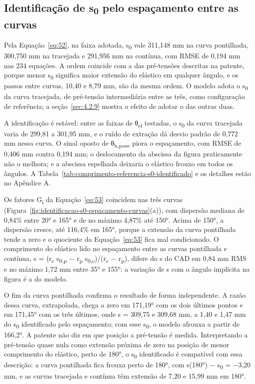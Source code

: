 \subsection{\texorpdfstring{Identificação de s\textsubscript{0} pelo espaçamento entre as curvas}{Identificação de s0 pelo espaçamento entre as curvas}}\label{sec:4.2.4}

Pela Equação~\eqref{eq:52}, na faixa adotada, s\textsubscript{0} vale 311,148 mm na curva pontilhada, 300,750 mm na tracejada e 291,956 mm na contínua, com RMSE de 0,194 mm nas 234 equações. A ordem coincide com a das pré-tensões descritas na patente, porque menor s\textsubscript{0} significa maior extensão do elástico em qualquer ângulo, e os passos entre curvas, 10,40 e 8,79 mm, são da mesma ordem. O modelo adota o s\textsubscript{0} da curva tracejada, de pré-tensão intermediária entre as três, como configuração de referência; a seção~\ref{sec:4.2.9} mostra o efeito de adotar o das outras duas.

A identificação é estável: entre as faixas de θ\textsubscript{el} testadas, o s\textsubscript{0} da curva tracejada varia de 299,81 a 301,95 mm, e o ruído de extração dá desvio padrão de 0,772 mm nessa curva. O sinal oposto de θ\textsubscript{b,pose} piora o espaçamento, com RMSE de 0,406 mm contra 0,194 mm; o deslocamento da abscissa da figura praticamente não o melhora; e a abscissa espelhada deixaria o elástico frouxo em todos os ângulos. A Tabela~\ref{tab:comprimento-referencia-s0-identificado} e os detalhes estão no Apêndice A.

Os fatores G\textsubscript{i} da Equação~\eqref{eq:53} coincidem nas três curvas (Figura~\ref{fig:identificacao-s0-espacamento-curvas}(a)), com dispersão mediana de 0,84\% entre 20° e 165° e de no máximo 4,87\% até 150°. Acima de 150°, a dispersão cresce, até 116,4\% em 165°, porque a extensão da curva pontilhada tende a zero e o quociente da Equação~\eqref{eq:53} fica mal condicionado. O comprimento do elástico lido no espaçamento entre as curvas pontilhada e contínua, s = (r\textsubscript{c} s\textsubscript{0,p} − r\textsubscript{p} s\textsubscript{0,c})/(r\textsubscript{c} − r\textsubscript{p}), difere do s do CAD em 0,84 mm RMS e no máximo 1,72 mm entre 35° e 155°: a variação de s com o ângulo implícita na figura é a do modelo.

O fim da curva pontilhada confirma o resultado de forma independente. A razão dessa curva, extrapolada, chega a zero em 171,19° com os dois últimos pontos e em 171,45° com os três últimos, onde s = 309,75 e 309,68 mm, a 1,40 e 1,47 mm do s\textsubscript{0} identificado pelo espaçamento; com esse s\textsubscript{0}, o modelo afrouxa a partir de 166,2°. A patente não diz em que posição a pré-tensão é medida. Interpretando a pré-tensão quase nula como extensão próxima de zero na posição de menor comprimento do elástico, perto de 180°, o s\textsubscript{0} identificado é compatível com essa descrição: a curva pontilhada fica frouxa perto de 180°, com s(180°) − s\textsubscript{0} = −3,20 mm, e as curvas tracejada e contínua têm extensão de 7,20 e 15,99 mm em 180°.

